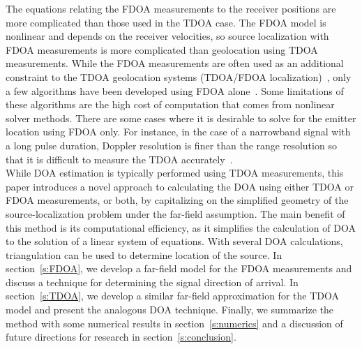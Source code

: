The equations relating the FDOA measurements to the receiver positions are more complicated than those used in the TDOA case. The FDOA model is nonlinear and depends on the receiver velocities, so source localization with FDOA measurements is more complicated than geolocation using TDOA measurements. While the FDOA measurements are often used as an additional constraint to the TDOA geolocation systems (TDOA/FDOA localization)~\cite{Ho1997}, only a few algorithms have been developed using FDOA alone~\cite{Cameron,Jinzhou2012}. Some limitations of these algorithms are the high cost of computation that comes from nonlinear solver methods. There are some cases where it is desirable to solve for the emitter location using FDOA only. For instance, in the case of a narrowband signal with a long pulse duration, Doppler resolution is finer than the range resolution so that it is difficult to measure the TDOA accurately~\cite{Cheney2009,Mason2005,Jinzhou2012}. \\

While DOA estimation is typically performed using TDOA measurements, this paper introduces a novel approach to calculating the DOA using either TDOA or FDOA measurements, or both, by capitalizing on the simplified geometry of the source-localization problem under the far-field assumption. The main benefit of this method is its computational efficiency, as it simplifies the calculation of DOA to the solution of a linear system of equations. With several DOA calculations, triangulation can be used to determine location of the source. In section~\ref{s:FDOA}, we develop a far-field model for the FDOA measurements and discuss a technique for determining the signal direction of arrival. In section~\ref{s:TDOA}, we develop a similar far-field approximation for the TDOA model and present the analogous DOA technique. Finally, we summarize the method with some numerical results in section~\ref{s:numerics} and a discussion of future directions for research in section~\ref{s:conclusion}.
